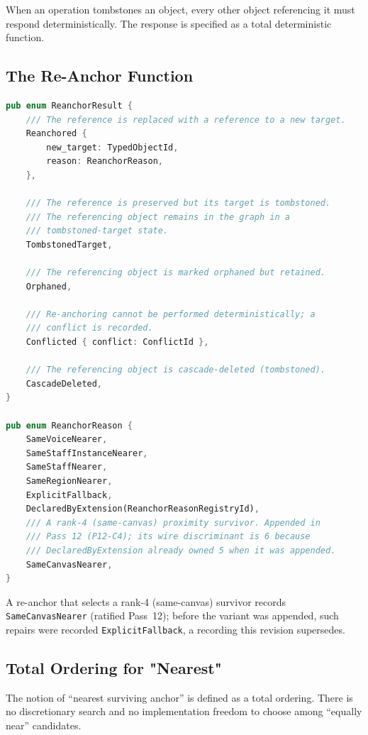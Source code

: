 \documentclass[11pt,letterpaper]{report}
\begin{document}
When an operation tombstones an object, every other object
referencing it must respond deterministically. The response is
specified as a total deterministic function.

\subsection{The Re-Anchor Function}

\begin{lstlisting}[language=Rust]
pub enum ReanchorResult {
    /// The reference is replaced with a reference to a new target.
    Reanchored {
        new_target: TypedObjectId,
        reason: ReanchorReason,
    },

    /// The reference is preserved but its target is tombstoned.
    /// The referencing object remains in the graph in a
    /// tombstoned-target state.
    TombstonedTarget,

    /// The referencing object is marked orphaned but retained.
    Orphaned,

    /// Re-anchoring cannot be performed deterministically; a
    /// conflict is recorded.
    Conflicted { conflict: ConflictId },

    /// The referencing object is cascade-deleted (tombstoned).
    CascadeDeleted,
}

pub enum ReanchorReason {
    SameVoiceNearer,
    SameStaffInstanceNearer,
    SameStaffNearer,
    SameRegionNearer,
    ExplicitFallback,
    DeclaredByExtension(ReanchorReasonRegistryId),
    /// A rank-4 (same-canvas) proximity survivor. Appended in
    /// Pass 12 (P12-C4); its wire discriminant is 6 because
    /// DeclaredByExtension already owned 5 when it was appended.
    SameCanvasNearer,
}
\end{lstlisting}

A re-anchor that selects a rank-4 (same-canvas) survivor records
\texttt{SameCanvasNearer} (ratified Pass~12); before the variant was
appended, such repairs were recorded \texttt{ExplicitFallback}, a
recording this revision supersedes.

\subsection{Total Ordering for "Nearest"}

The notion of ``nearest surviving anchor'' is defined as a total
ordering. There is no discretionary search and no implementation
freedom to choose among ``equally near'' candidates.
\end{document}
